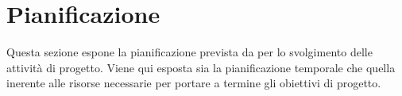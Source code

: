 









\section{Pianificazione}
Questa sezione espone la pianificazione prevista da \team per lo svolgimento delle attività di progetto. Viene qui esposta sia la pianificazione temporale che quella inerente alle risorse necessarie per portare a termine gli obiettivi di progetto.

